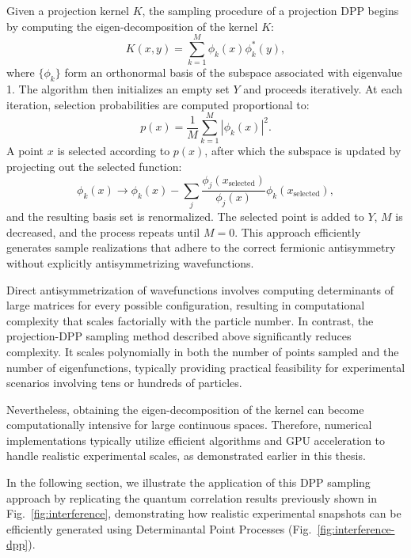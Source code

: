 
Given a projection kernel $K$, the sampling procedure of a projection DPP begins by computing the eigen-decomposition of the kernel $K$:
\begin{equation}
K(x,y) = \sum_{k=1}^{M} \phi_k(x)\phi_k^*(y),
\end{equation}
where $\{\phi_k\}$ form an orthonormal basis of the subspace associated with eigenvalue 1.
The algorithm then initializes an empty set $Y$ and proceeds iteratively. At each iteration, selection probabilities are computed proportional to:
\begin{equation}
p(x) = \frac{1}{M} \sum_{k=1}^{M} |\phi_k(x)|^2.
\end{equation}
A point $x$ is selected according to $p(x)$, after which the subspace is updated by projecting out the selected function:
\begin{equation}
\phi_k(x) \rightarrow \phi_k(x) - \sum_j \frac{\phi_j(x_{\text{selected}})}{\phi_j(x)} \phi_k(x_{\text{selected}}),
\end{equation}
and the resulting basis set is renormalized. The selected point is added to $Y$, $M$ is decreased, and the process repeats until $M = 0$. This approach efficiently generates sample realizations that adhere to the correct fermionic antisymmetry without explicitly antisymmetrizing wavefunctions.


Direct antisymmetrization of wavefunctions involves computing determinants of large matrices for every possible configuration, resulting in computational complexity that scales factorially with the particle number. In contrast, the projection-DPP sampling method described above significantly reduces complexity. It scales polynomially in both the number of points sampled and the number of eigenfunctions, typically providing practical feasibility for experimental scenarios involving tens or hundreds of particles.

Nevertheless, obtaining the eigen-decomposition of the kernel can become computationally intensive for large continuous spaces. Therefore, numerical implementations typically utilize efficient algorithms and GPU acceleration to handle realistic experimental scales, as demonstrated earlier in this thesis.

In the following section, we illustrate the application of this DPP sampling approach by replicating the quantum correlation results previously shown in Fig.~\ref{fig:interference}, demonstrating how realistic experimental snapshots can be efficiently generated using Determinantal Point Processes (Fig.~\ref{fig:interference-dpp}).
